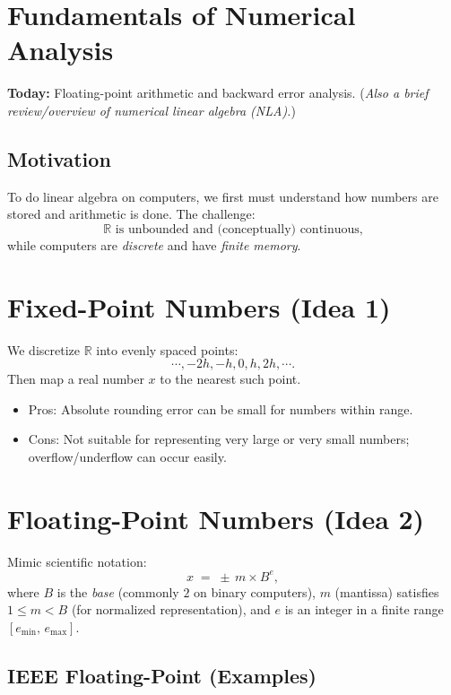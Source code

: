 \section{Fundamentals of Numerical Analysis}

\textbf{Today:} Floating-point arithmetic and backward error analysis.  
(\textit{Also a brief review/overview of numerical linear algebra (NLA).})

\subsection*{Motivation}

To do linear algebra on computers, we first must understand how numbers are stored and arithmetic is done. The challenge:
\[
\mathbb{R} \text{ is unbounded and (conceptually) continuous,}
\]
while computers are \emph{discrete} and have \emph{finite memory}.

\section*{Fixed-Point Numbers (Idea 1)}

We discretize $\mathbb{R}$ into evenly spaced points:
\[
\cdots, -2h, -h, 0, h, 2h, \cdots.
\]
Then map a real number $x$ to the nearest such point.

\begin{itemize}
    \item Pros: Absolute rounding error can be small for numbers within range.
    \item Cons: Not suitable for representing very large or very small numbers; overflow/underflow can occur easily.
\end{itemize}

\section*{Floating-Point Numbers (Idea 2)}

Mimic scientific notation:
\[
x \;=\; \pm \, m \times B^e,
\]
where $B$ is the \emph{base} (commonly $2$ on binary computers), $m$ (mantissa) satisfies $1 \le m < B$ (for normalized representation), and $e$ is an integer in a finite range $[e_{\min},\, e_{\max}]$.

\subsection*{IEEE Floating-Point (Examples)}

